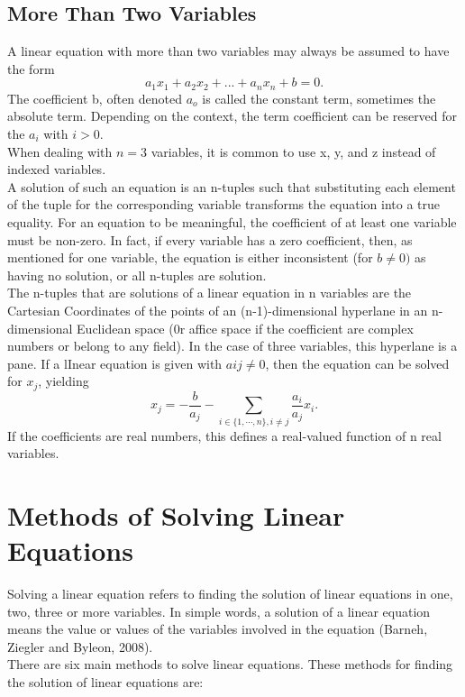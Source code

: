 \documentclass[a4paper, 12pt]{report}
\begin{document}
{\subsection{More Than Two Variables}
A linear equation with more than two variables may always be assumed to have the form 
\begin{equation}
 a_1 x_1 + a_2 x_2 + ... + a_n x_n + b = 0.
 \end{equation}
The coefficient b, often denoted $a_o$ is called the constant term, sometimes the absolute term. Depending on the context, the term coefficient can be reserved for the $a_i$ with $i > 0$.\\
When dealing with $n = 3$ variables, it is common to use x, y, and z instead of indexed variables.\\
 A solution of such an equation is an n-tuples such that substituting each element of the tuple for the corresponding variable transforms the equation into a true equality.
For an equation to be meaningful, the coefficient of at least one variable must be non-zero. In fact, if every variable has a zero coefficient, then, as mentioned for one variable, the equation is either inconsistent (for $b \neq 0)$ as having no solution, or all n-tuples are solution. \\
The n-tuples that are solutions of a linear equation in n variables are the Cartesian Coordinates of the points of an (n-1)-dimensional hyperlane in an n-dimensional Euclidean space (0r affice space if the coefficient are complex numbers or belong to any field). In the case of three variables, this hyperlane is a pane.
          If a lInear equation is given with $aij \neq 0$, then the equation can be solved for $x_j$, yielding 
          \begin{equation}
          x_j = -\frac{b}{a_j} - \sum_{i\in\{1,\cdots,n\},i \neq j} \frac{a_i}{a_j} x_i. 					
          \end{equation}
          If the coefficients are real numbers, this defines a real-valued function of n real variables.\\
          
          
         \section{Methods of Solving Linear Equations}
        Solving a linear equation refers to finding the solution of linear equations in one, two, three or more variables. In simple words, a solution of a linear equation means the value or values of the variables involved in the equation (Barneh, Ziegler and Byleon, 2008).\\
         There are six main methods to solve linear equations. These methods for finding the solution of linear equations are:
\\        
      
}
\end{document}
